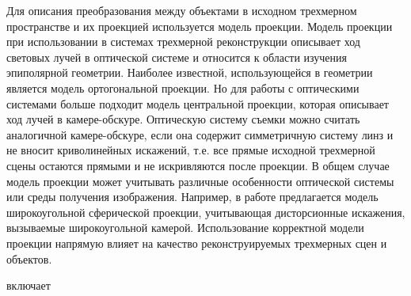 Для описания преобразования между объектами в исходном трехмерном пространстве и их проекцией используется модель проекции. Модель проекции при использовании в системах трехмерной реконструкции описывает ход световых лучей в оптической системе и относится к области изучения эпиполярной геометрии. Наиболее известной, использующейся в геометрии является модель ортогональной проекции. Но для работы с оптическими системами больше подходит модель центральной проекции, которая описывает ход лучей в камере-обскуре.  Оптическую систему съемки можно считать аналогичной камере-обскуре, если она содержит симметричную систему линз и не вносит криволинейных искажений, т.е. все прямые исходной трехмерной сцены остаются прямыми и не искривляются после проекции. В общем случае модель проекции может учитывать различные особенности оптической системы или среды получения изображения. Например, в работе  предлагается модель широкоугольной сферической проекции, учитывающая дисторсионные искажения, вызываемые широкоугольной камерой. Использование корректной модели проекции напрямую влияет на качество реконструируемых трехмерных сцен и объектов.

\begin{SCn}
\end{SCn}

\begin{SCn}
    \begin{scnrelfromset}{включает}
        \begin{scnindent}    
        \end{scnindent}
    \end{scnrelfromset}
\end{SCn}

